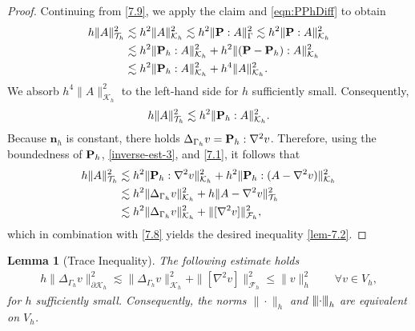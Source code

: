 \documentclass[10pt, a4paper]{amsart}
\newcommand{\bn}{{\bm n}}
\newcommand{\nab}{\nabla}
\newcommand{\calT}{\mathcal{T}}
\newcommand{\calF}{\mathcal{F}}
\newcommand{\calK}{\mathcal{K}}
\newtheorem{lemma}[theorem]{Lemma}
\theoremstyle{definition}
\theoremstyle{remark}
\theoremstyle{example}
\numberwithin{equation}{section}
\newcommand{\tbar}[1]{{\left\vert\kern-0.25ex\left\vert\kern-0.25ex\left\vert #1 
    \right\vert\kern-0.25ex\right\vert\kern-0.25ex\right\vert}}
\begin{document}
\begin{proof}
Continuing from \eqref{7.9}, we apply the claim and \eqref{eqn:PPhDiff} to obtain
\begin{align*}
h\|A\|_{\calT_h}^2
& \lesssim h^2\|A\|_{\calK_h}^2 \lesssim h^2\|{\bf P} : A\|_\Gamma^2 \lesssim h^2\|{\bf P} : A\|_{\calK_h}^2 \\
& \lesssim h^2\|{\bf P}_{h} : A\|_{\calK_h}^2 + h^2\|({\bf P} - {\bf P}_{h}) : A\|_{\calK_h}^2 \\
& \lesssim h^2\|{\bf P}_{h} : A\|_{\calK_h}^2 + h^4\|A\|_{\calK_h}^2.
\end{align*}
We absorb $h^4\|A\|_{\calK_h}^2$ to the left-hand side for $h$ sufficiently small. Consequently,
\begin{align}
h\|A\|_{\calT_h}^2
\lesssim h^2\|{\bf P}_{h} : A\|_{\calK_h}^2. \label{7.10}
\end{align}
Because $\bn_h$ is constant, there holds
$\Delta_{\Gamma_h} v = {\bf P}_h:\nab^2 v$.
Therefore, using the boundedness of ${\bf P}_{h}$, \eqref{inverse-est-3}, and \eqref{7.1}, it follows that
\begin{align*}
h\|A\|_{\calT_h}^2
& \lesssim h^2\|{\bf P}_{h} : \nab^2v\|_{\calK_h}^2 + h^2\|{\bf P}_{h} : (A - \nab^2v)\|_{\calK_h}^2 \notag \\
& \lesssim h^2\|\Delta_{\Gamma_h} v\|_{\calK_h}^2 + h\|A - \nab^2v\|_{\calT_h}^2 \notag \\
& \lesssim h^2\|\Delta_{\Gamma_h} v\|_{\calK_h}^2 + \|[\nab^2v]\|_{\calF_h}^2,
\end{align*}
which in combination with \eqref{7.8} %
yields the desired inequality \eqref{lem-7.2}.
\end{proof}


\begin{lemma}[Trace Inequality]
The following estimate holds
\begin{align}
h\|\Delta_{\Gamma_h}v\|_{\partial\calK_h}^2
\lesssim \|\Delta_{\Gamma_h}v\|_{\calK_h}^2 + \|[\nab^2v]\|_{\calF_h}^2
\le \|v\|_h^2 \qquad \forall v \in V_h,
\label{7.12}
\end{align}
for $h$ sufficiently small. Consequently, the norms $\|\cdot\|_h$ and $\tbar{\cdot}_h$ are equivalent on $V_h$.
\end{lemma}
\end{document}
